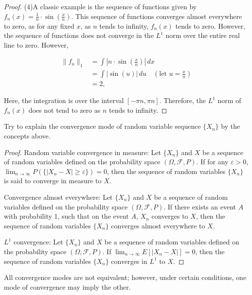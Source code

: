 \begin{proof}
    (4)A classic example is the sequence of functions given by
    $f_n(x) = \frac{1}{n} \cdot \sin\left(\frac{x}{n}\right)$.
    This sequence of functions converges almost everywhere to zero, 
    as for any fixed $x$, as $n$ tends to infinity, $f_n(x)$ tends to zero.
    However, the sequence of functions does not converge in the $L^1$ 
    norm over the entire real line to zero.
    However,

    $$
    \begin{aligned}
    \|f_n\|_1 &= \int |n \cdot \sin\left(\frac{x}{n}\right)| \, dx \\
    &= \int | \sin(u) | \, du \quad (\text{let } u = \frac{x}{n}) \\
    &= 2,
    \end{aligned}
    $$

    Here, the integration is over the interval $[- \pi n, \pi n]$. 
    Therefore, the $L^1$ norm of $f_n(x)$ does not tend to zero as $n$ 
    tends to infinity.
\end{proof}
\begin{exc}
    Try to explain the convergence mode of random variable 
    sequence $\{X_{n}\}$ by the concepts above.
\end{exc}
\begin{proof}
    Random variable convergence in measure: Let $\{X_n\}$ and 
    $X$ be a sequence of random variables defined on the 
    probability space $(\Omega, \mathcal{F}, P)$. If for any 
    $\varepsilon > 0$, $\lim_{n \to \infty} P(\{|X_n - X| \geq 
    \varepsilon\}) = 0$, then the sequence of random variables 
    $\{X_n\}$ is said to converge in measure to $X$.

    Convergence almost everywhere: Let $\{X_n\}$ and $X$ be a 
    sequence of random variables defined on the probability space 
    $(\Omega, \mathcal{F}, P)$. If there exists an event $A$ with 
    probability 1, such that on the event $A$, $X_n$ converges to 
    $X$, then the sequence of random variables $\{X_n\}$ converges 
    almost everywhere to $X$.

    $L^1$ convergence: Let $\{X_n\}$ and $X$ be a sequence of random 
    variables defined on the probability space $(\Omega, \mathcal{F}, P)$.
    If $\lim_{n \to \infty} E[|X_n - X|] = 0$, then the sequence of 
    random variables $\{X_n\}$ converges in $L^1$ to $X$.
\end{proof}
\begin{rem}
    All convergence modes are not equivalent; 
    however, under certain conditions, 
    one mode of convergence may imply the other.
\end{rem}
